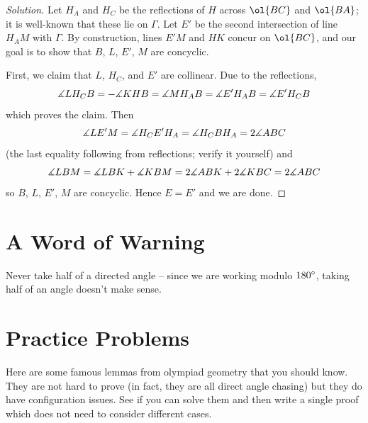 \documentclass[11pt]{scrartcl}
\begin{document}
\begin{proof}
  [Solution]
  Let $H_A$ and $H_C$ be the reflections of $H$ across $\ol{BC}$ and $\ol{BA}$;
  it is well-known that these lie on $\Gamma$.
  Let $E'$ be the second intersection of line $H_AM$ with $\Gamma$.
  By construction, lines $E'M$ and $HK$ concur on $\ol{BC}$, and our goal is to show that $B$, $L$, $E'$,
  $M$ are concyclic.

  First, we claim that $L$, $H_C$, and $E'$ are collinear.
  Due to the reflections,
  \[ \measuredangle LH_CB = -\measuredangle KHB = \measuredangle MH_AB
  = \measuredangle E'H_AB = \measuredangle E'H_CB \]
  which proves the claim.
  Then
  \[ \measuredangle LE'M = \measuredangle H_CE'H_A = \measuredangle H_CBH_A = 2\measuredangle ABC \]
  (the last equality following from reflections; verify it yourself) and
  \[ \measuredangle LBM = \measuredangle LBK + \measuredangle KBM = 2\measuredangle ABK + 2\measuredangle KBC = 2\measuredangle ABC \]
  so $B$, $L$, $E'$, $M$ are concyclic. Hence $E=E'$ and we are done.
\end{proof}


\section{A Word of Warning}
Never take half of a directed angle -- since we are working modulo $180^\circ$,
taking half of an angle doesn't make sense.

\section{Practice Problems}
Here are some famous lemmas from olympiad geometry that you should know.
They are not hard to prove (in fact, they are all direct angle chasing) but they do have configuration issues.
See if you can solve them and then write a single proof which does not need to consider different cases.
\end{document}
